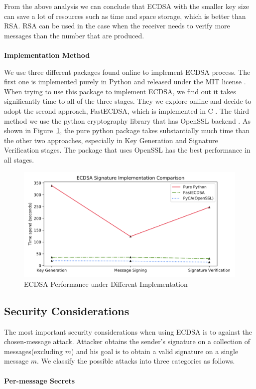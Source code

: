 \documentclass[10pt,sigconf]{acmart}
\begin{document}
From the above analysis we can conclude that ECDSA with the smaller key size can save a lot of resources such as time and space storage, which is better than RSA. RSA can be used in the case when the receiver needs to verify more messages than the number that are produced. 
\\
\\
\noindent \textbf{Implementation Method}

We use three different packages found online to implement ECDSA process. The first one is implemented purely in Python and released under the MIT license \cite{BrianWarnerECDSA}. When trying to use this package to implement ECDSA, we find out it takes significantly time to all of the three stages. They we explore online and decide to adopt the second approach, FastECDSA, which is implemented in C \cite{AntonKueltzECDSA}. The third method we use the python cryptography library that has OpenSSL backend \cite{PyCACryptography}. As shown in Figure~\ref{fig:ECDSA_Implementation_Compare_Steps}, the pure python package takes substantially much time than the other two approaches, especially in Key Generation and Signature Verification stages. The package that uses OpenSSL has the best performance in all stages.

\begin{figure}[H]
\centering
\includegraphics[scale=0.45]{ECDSA_Implementation_Compare_Steps}
\caption{\small{ECDSA Performance under Different Implementation}}
\label{fig:ECDSA_Implementation_Compare_Steps}
\end{figure}

\subsection{Security Considerations}

The most important security considerations when using ECDSA is to against the chosen-message attack. Attacker obtains the sender’s signature on a collection of messages(excluding $m$) and his goal is to obtain a valid signature on a single message $m$. We classify the possible attacks into three categories as follows. 
\\
\\
\noindent \textbf{Per-message Secrets}
\end{document}
